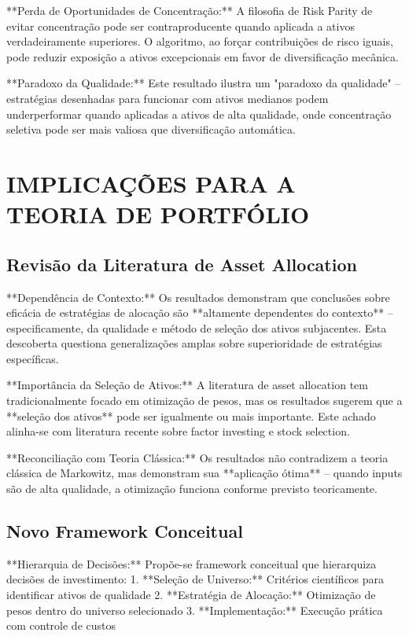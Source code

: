 **Perda de Oportunidades de Concentração:** A filosofia de Risk Parity de evitar concentração pode ser contraproducente quando aplicada a ativos verdadeiramente superiores. O algoritmo, ao forçar contribuições de risco iguais, pode reduzir exposição a ativos excepcionais em favor de diversificação mecânica.

**Paradoxo da Qualidade:** Este resultado ilustra um "paradoxo da qualidade" – estratégias desenhadas para funcionar com ativos medianos podem underperformar quando aplicadas a ativos de alta qualidade, onde concentração seletiva pode ser mais valiosa que diversificação automática.

\section{IMPLICAÇÕES PARA A TEORIA DE PORTFÓLIO}

\subsection{Revisão da Literatura de Asset Allocation}

**Dependência de Contexto:** Os resultados demonstram que conclusões sobre eficácia de estratégias de alocação são **altamente dependentes do contexto** – especificamente, da qualidade e método de seleção dos ativos subjacentes. Esta descoberta questiona generalizações amplas sobre superioridade de estratégias específicas.

**Importância da Seleção de Ativos:** A literatura de asset allocation tem tradicionalmente focado em otimização de pesos, mas os resultados sugerem que a **seleção dos ativos** pode ser igualmente ou mais importante. Este achado alinha-se com literatura recente sobre factor investing e stock selection.

**Reconciliação com Teoria Clássica:** Os resultados não contradizem a teoria clássica de Markowitz, mas demonstram sua **aplicação ótima** – quando inputs são de alta qualidade, a otimização funciona conforme previsto teoricamente.

\subsection{Novo Framework Conceitual}

**Hierarquia de Decisões:** Propõe-se framework conceitual que hierarquiza decisões de investimento:
1. **Seleção de Universo:** Critérios científicos para identificar ativos de qualidade
2. **Estratégia de Alocação:** Otimização de pesos dentro do universo selecionado
3. **Implementação:** Execução prática com controle de custos

